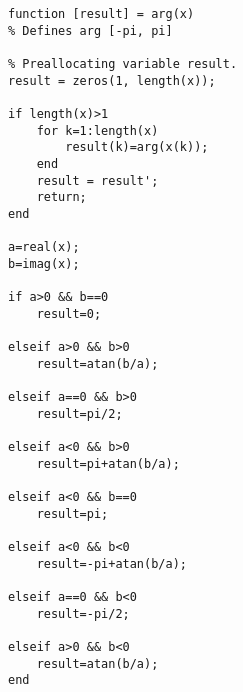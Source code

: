 \begin{verbatim}
function [result] = arg(x)
% Defines arg [-pi, pi]

% Preallocating variable result.
result = zeros(1, length(x));

if length(x)>1
    for k=1:length(x)
        result(k)=arg(x(k));
    end
    result = result';
    return;
end
    
a=real(x); 
b=imag(x);

if a>0 && b==0
    result=0;

elseif a>0 && b>0
    result=atan(b/a);
    
elseif a==0 && b>0
    result=pi/2;
    
elseif a<0 && b>0
    result=pi+atan(b/a);
    
elseif a<0 && b==0
    result=pi;
    
elseif a<0 && b<0
    result=-pi+atan(b/a);
    
elseif a==0 && b<0
    result=-pi/2;
    
elseif a>0 && b<0
    result=atan(b/a);
end
\end{verbatim}
